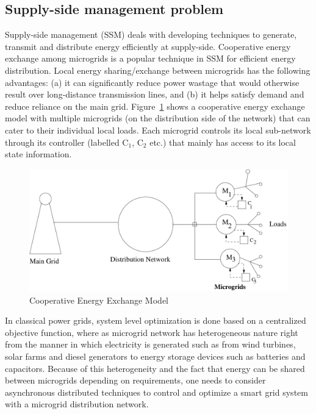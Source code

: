 \subsection{Supply-side management problem} \label{subsec:ssm}
 Supply-side management (SSM)\cite{} deals with developing techniques to  generate, transmit and distribute energy efficiently at supply-side. Cooperative energy exchange among microgrids is a popular technique in SSM for efficient energy distribution.  Local energy sharing/exchange between microgrids has the
following advantages:
(a) it can significantly reduce power wastage that would
otherwise result over long-distance transmission lines, and (b) it
helps satisfy demand and reduce reliance on the main grid. 
 Figure~\ref{gridmodel} shows a cooperative energy exchange model with multiple microgrids
(on the distribution side of the network) that can cater to their individual
local loads. Each microgrid controls its local sub-network through its controller (labelled
$\mbox{C}_1$, $\mbox{C}_2$ etc.) that mainly has access to its local state information.


\begin{figure}[thpb]
      \centering
      \includegraphics[scale=0.4]{powergrid2.pdf}
      \caption{Cooperative Energy Exchange Model}
      \label{gridmodel}
\end{figure}

 In classical power grids, system level optimization is done based on a centralized
objective function, where as 
microgrid network has heterogeneous nature right from the manner in which electricity
is generated such as from wind turbines, solar farms and diesel generators
to energy storage devices such as batteries and capacitors.
 Because of this heterogeneity and the fact that energy can be shared between microgrids depending
on requirements, one needs to consider asynchronous distributed techniques 
 to control and optimize a smart grid system
with a microgrid distribution network.



